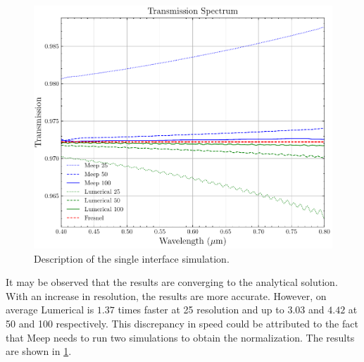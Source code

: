 \begin{figure}[H]\label{fig:single-interface}
  \centering
  \includegraphics[width=1\textwidth]{obrazky-figures/single-interface.pdf}
  \caption{Description of the single interface simulation.}
\end{figure}

It may be observed that the results are converging to the analytical solution. With an increase in resolution, the results are more accurate. However, on average Lumerical is $1.37$ times faster at 25 resolution and up to $3.03$ and $4.42$ at 50 and 100 respectively. This discrepancy in speed could be attributed to the fact that Meep needs to run two simulations to obtain the normalization. The results are shown in \cref{fig:single-interface}.





